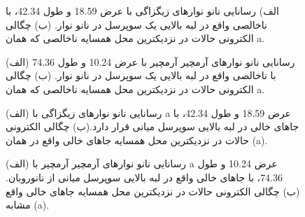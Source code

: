   \begin{figure}[!ht]
    \centering
    
    \caption{الف) رسانایی نانو نوارهای زیگزاگی با عرض \lr{\AA}18.59 و طول \lr{\AA} 42.34، با ناخالصی واقع در لبه بالایی یک سوپرسل در نانو نوار. (ب) چگالی الکترونی حالات در نزدیکترین محل همسایه ناخالصی که همان a.}
    \label{zigscatter}
  \end{figure}
  \begin{figure}[ht]
    \centering
    
    \caption{(الف) رسانایی نانو نوارهای آرمچیر آرمچیر با عرض \lr{\AA} 10.24 و طول \lr{\AA} 74.36 با ناخالصی واقع در لبه بالایی یک سوپرسل در نانو نوار. (ب) چگالی الکترونی حالات در نزدیکترین محل همسایه ناخالصی که همان a.}
    \label{armscatter}
  \end{figure}

\begin{figure}[ht]
    \centering
    
    \caption{(الف) رسانایی نانو نوارهای زیگزاگی با a
    عرض \lr{\AA} 18.59 و طول \lr{\AA} 42.34، با جاهای خالی در لبه بالایی سوپرسل میانی قرار دارد.(ب) چگالی الکترونی حالات در نزدیکترین محل همسایه جاهای خالی واقع در همان (a).}
    \label{zigvacancy}
  \end{figure}
  
\begin{figure}[ht]
\centering

\caption{(الف) رسانایی نانو نوارهای آرمچیر آرمچیر با a
عرض \lr{\AA} 10.24 و طول \lr{\AA} 74.36، با جاهای خالی واقع در لبه بالایی سوپرسل میانی از نانوروبان. (ب) چگالی الکترونی حالات در نزدیکترین محل همسایه جاهای خالی واقع مشابه (a).}
\label{armvacancy}
\end{figure}
